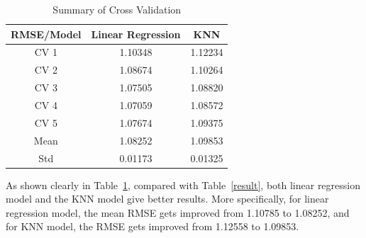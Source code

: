\begin{table}[htbp]
 \caption{Summary of Cross Validation} \label{result2}
 \vspace{0.1in}
\begin{center}
  \begin{tabular}{  c  c  c}
    \hline
    RMSE/Model        & Linear Regression        & KNN     \\ \hline
    CV 1                     & 1.10348                           & 1.12234 \\ \hline
    CV 2                    & 1.08674                           & 1.10264 \\ \hline
    CV 3                    & 1.07505                           & 1.08820 \\ \hline
    CV 4                    & 1.07059                           & 1.08572 \\ \hline
    CV 5                    & 1.07674                           & 1.09375 \\ \hline
    Mean                   & 1.08252                           &  1.09853 \\ \hline 
    Std                      &  0.01173                           &  0.01325 \\ \hline 
  \end{tabular}
\end{center}
\end{table}

As shown clearly in Table~\ref{result2}, compared with Table~\ref{result}, both linear regression model and the KNN model give better results. More specifically, for linear regression model, the mean RMSE gets improved from 1.10785 to 1.08252, and for KNN model, the RMSE gets improved from 1.12558 to 1.09853.


\clearpage

%
%
%




